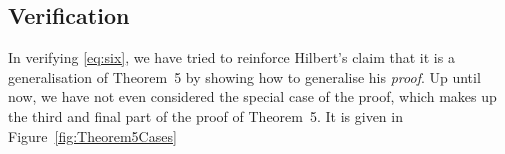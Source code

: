 
\subsection{Verification}
In verifying \ref{eq:six}, we have tried to reinforce Hilbert's claim that it is a generalisation of Theorem~5 by showing how to generalise his \emph{proof}. Up until now, we have not even considered the special case of the proof, which makes up the third and final part of the proof of Theorem~5. It is given in Figure~\ref{fig:Theorem5Cases}

